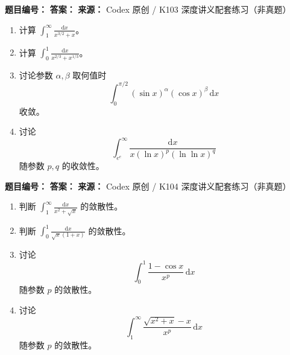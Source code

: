 \begin{problemBox}
\begin{problemMeta}
\textbf{题目编号：} \quad
\textbf{答案：} \quad
\textbf{来源：} Codex 原创 / K103 深度讲义配套练习（非真题）
\end{problemMeta}
\begin{enumerate}
  \item[\textbf{A}] 计算
  \(\displaystyle\int_1^\infty\frac{\mathrm dx}{x^{3/2}+x}\)。
  \item[\textbf{B}] 计算
  \(\displaystyle\int_0^1
  \frac{\mathrm dx}{x^{2/3}+x^{1/3}}\)。
  \item[\textbf{C}] 讨论参数 \(\alpha,\beta\) 取何值时
  \[
  \int_0^{\pi/2}(\sin x)^\alpha(\cos x)^\beta\,\mathrm dx
  \]
  收敛。
  \item[\textbf{M}] 讨论
  \[
  \int_{e^e}^\infty
  \frac{\mathrm dx}{x(\ln x)^p(\ln\ln x)^q}
  \]
  随参数 \(p,q\) 的收敛性。
\end{enumerate}
\end{problemBox}

\begin{problemBox}
\begin{problemMeta}
\textbf{题目编号：} \quad
\textbf{答案：} \quad
\textbf{来源：} Codex 原创 / K104 深度讲义配套练习（非真题）
\end{problemMeta}
\begin{enumerate}
  \item[\textbf{A}] 判断
  \(\displaystyle\int_1^\infty\frac{\mathrm dx}{x^2+\sqrt x}\)
  的敛散性。
  \item[\textbf{B}] 判断
  \(\displaystyle\int_0^1\frac{\mathrm dx}{\sqrt x(1+x)}\)
  的敛散性。
  \item[\textbf{C}] 讨论
  \[
  \int_0^1\frac{1-\cos x}{x^p}\,\mathrm dx
  \]
  随参数 \(p\) 的敛散性。
  \item[\textbf{M}] 讨论
  \[
  \int_1^\infty
  \frac{\sqrt{x^2+x}-x}{x^p}\,\mathrm dx
  \]
  随参数 \(p\) 的敛散性。
\end{enumerate}
\end{problemBox}

